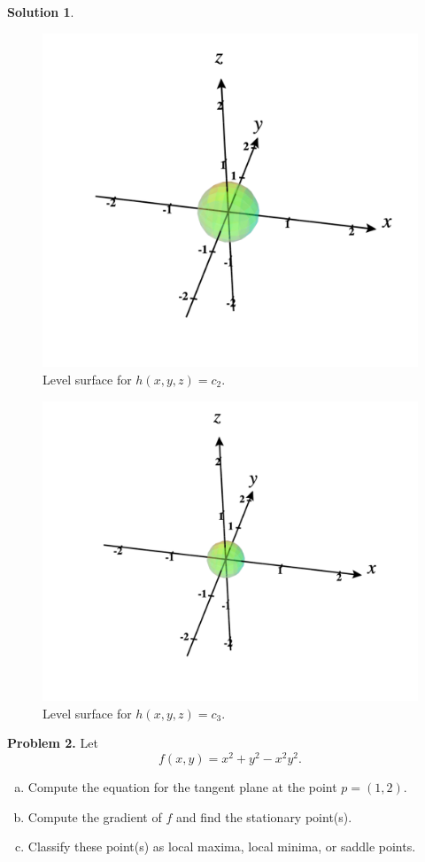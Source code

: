 \documentclass[12pt]{report} %
\theoremstyle{definition}
\newtheorem{solution}{Solution}
\begin{document}
\begin{solution}
\begin{enumerate}[(a)]
        \begin{figure}[H]
        \centering
        \includegraphics[width=.6\textwidth]{Images/level_surface_c2.png}
        \caption{Level surface for $h(x,y,z)=c_2$.}
    \end{figure}
        \begin{figure}[H]
        \centering
        \includegraphics[width=.6\textwidth]{Images/level_surface_c3.png}
        \caption{Level surface for $h(x,y,z)=c_3$.}
    \end{figure}
\end{enumerate}
\end{solution}

\vspace*{.5cm}


\noindent\textbf{Problem 2.} Let
\[
f(x,y) = x^2+y^2-x^2y^2.
\]
\begin{enumerate}[(a)]
    \item Compute the equation for the tangent plane at the point $p=(1,2)$.
    \item Compute the gradient of $f$ and find the stationary point(s).
    \item Classify these point(s) as local maxima, local minima, or saddle points.
\end{enumerate}
\end{document}
